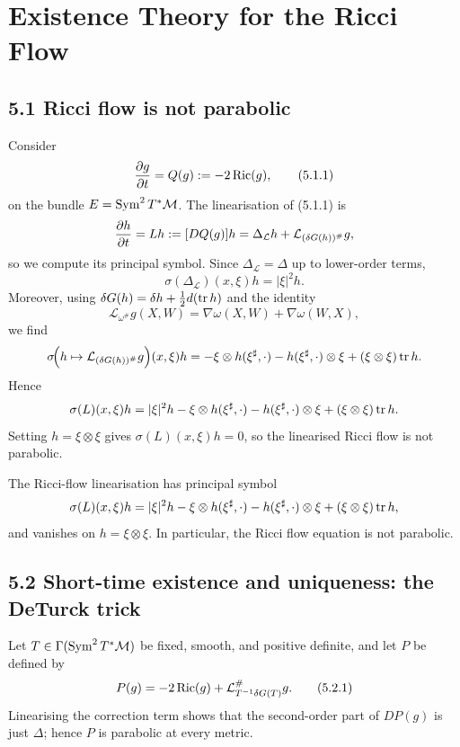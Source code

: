 \chapter{Existence Theory for the Ricci Flow}

\section*{5.1 \quad Ricci flow is not parabolic}

Consider
\[
\frac{\partial g}{\partial t} = Q(g) := -2\operatorname{Ric}(g),
\tag{5.1.1}
\]
on the bundle $E=\operatorname{Sym}^2 T^*\mathcal{M}$. The linearisation of \textup{(5.1.1)} is
\[
\frac{\partial h}{\partial t}=Lh:= [DQ(g)]h = \Delta_{\mathcal L}h+\mathcal L_{(\delta G(h))^\#}g,
\]
so we compute its principal symbol. Since $\Delta_{\mathcal L}=\Delta$ up to lower-order terms,
\[
\sigma(\Delta_{\mathcal L})(x,\xi)h = |\xi|^2 h.
\]
Moreover, using $\delta G(h)=\delta h+\frac12 d(\operatorname{tr} h)$ and the identity
\[
\mathcal L_{\omega^\#}g(X,W)=\nabla\omega(X,W)+\nabla\omega(W,X),
\]
we find
\[
\sigma\!\Bigl(h\mapsto \mathcal L_{(\delta G(h))^\#}g\Bigr)(x,\xi)h
=-\xi\otimes h(\xi^\sharp,\cdot)-h(\xi^\sharp,\cdot)\otimes\xi+(\xi\otimes\xi)\operatorname{tr} h.
\]
Hence
\[
\sigma(L)(x,\xi)h
=|\xi|^2h-\xi\otimes h(\xi^\sharp,\cdot)-h(\xi^\sharp,\cdot)\otimes\xi+(\xi\otimes\xi)\operatorname{tr} h.
\]
Setting $h=\xi\otimes\xi$ gives $\sigma(L)(x,\xi)h=0$, so the linearised Ricci flow is not parabolic.

\begin{remark}
\label{topping-ricci-flow-linearisation-not-parabolic}
The Ricci-flow linearisation has principal symbol
\[
\sigma(L)(x,\xi)h
=|\xi|^2h-\xi\otimes h(\xi^\sharp,\cdot)-h(\xi^\sharp,\cdot)\otimes\xi+(\xi\otimes\xi)\operatorname{tr} h,
\]
and vanishes on $h=\xi\otimes\xi$. In particular, the Ricci flow equation is not parabolic.
\end{remark}

\section*{5.2 \quad Short-time existence and uniqueness: the DeTurck trick}

Let $T\in\Gamma(\operatorname{Sym}^2T^*\mathcal{M})$ be fixed, smooth, and positive definite, and let $P$ be defined by
\[
P(g)=-2\operatorname{Ric}(g)+\mathcal L_{T^{-1}\delta G(T)}^{\#}g.
\tag{5.2.1}
\]
Linearising the correction term shows that the second-order part of $DP(g)$ is just $\Delta$; hence $P$ is parabolic at every metric.

